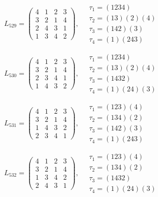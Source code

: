 $L_{529} = \begin{pmatrix} 4 & 1 & 2 & 3 \\ 3 & 2 & 1 & 4 \\ 2 & 4 & 3 & 1 \\ 1 & 3 & 4 & 2 \end{pmatrix}, \quad \begin{matrix} \tau_{1} = (1 2 3 4) \\ \tau_{2} = (1 3)(2)(4) \\ \tau_{3} = (1 4 2)(3) \\ \tau_{4} = (1)(2 4 3) \end{matrix}$

$L_{530} = \begin{pmatrix} 4 & 1 & 2 & 3 \\ 3 & 2 & 1 & 4 \\ 2 & 3 & 4 & 1 \\ 1 & 4 & 3 & 2 \end{pmatrix}, \quad \begin{matrix} \tau_{1} = (1 2 3 4) \\ \tau_{2} = (1 3)(2)(4) \\ \tau_{3} = (1 4 3 2) \\ \tau_{4} = (1)(2 4)(3) \end{matrix}$

$L_{531} = \begin{pmatrix} 4 & 1 & 2 & 3 \\ 3 & 2 & 1 & 4 \\ 1 & 4 & 3 & 2 \\ 2 & 3 & 4 & 1 \end{pmatrix}, \quad \begin{matrix} \tau_{1} = (1 2 3)(4) \\ \tau_{2} = (1 3 4)(2) \\ \tau_{3} = (1 4 2)(3) \\ \tau_{4} = (1)(2 4 3) \end{matrix}$

$L_{532} = \begin{pmatrix} 4 & 1 & 2 & 3 \\ 3 & 2 & 1 & 4 \\ 1 & 3 & 4 & 2 \\ 2 & 4 & 3 & 1 \end{pmatrix}, \quad \begin{matrix} \tau_{1} = (1 2 3)(4) \\ \tau_{2} = (1 3 4)(2) \\ \tau_{3} = (1 4 3 2) \\ \tau_{4} = (1)(2 4)(3) \end{matrix}$

